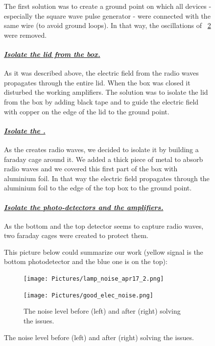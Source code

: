 \begin{figure}[!hbtp]
  The first solution was to create a ground point on which all devices - especially the square wave pulse generator - were connected with the same wire 
  (to avoid ground loops). In that way, the oscillations of ~\ref{fig:comparaison} were removed. 
  
  \paragraph{\underline{\emph{Isolate the lid from the box.}}}
  
  As it was described above, the electric field from the radio waves propagates through the entire lid. When the box was closed it disturbed the working 
  amplifiers. The solution was to isolate the lid from the box by adding black tape and to guide the electric field with copper on the edge of the lid
  to the ground point.

  \paragraph{\underline{\emph{Isolate the \xfl.}}}
  
  As the \xfl creates radio waves, we decided to isolate it by building a faraday cage around it. We added a thick piece of metal to absorb radio waves 
  and we covered this first part of the box with aluminium foil. In that way the electric field propagates through the aluminium foil to the edge of the top
  box to the ground point. 

  \paragraph{\underline{\emph{Isolate the photo-detectors and the amplifiers.}}}
  
  As the bottom and the top detector seems to capture radio waves, two faraday cages were created to protect them.
  
  This picture below could summarize our work (yellow signal is the bottom photodetector and the blue one is on the top):
 
  \begin{figure}[!hbtp]
  \begin{minipage}[t,High electronic noise level.]{0.49\linewidth}
    \texttt{[image: Pictures/lamp\_noise\_apr17\_2.png]}
  \end{minipage}
  \quad
  \begin{minipage}[t,Low electronic noise level.]{0.49\linewidth}
    \texttt{[image: Pictures/good\_elec\_noise.png]}
  \end{minipage}
  \caption{The noise level before (left) and after (right) solving the issues.}
  \label{fig:comparaison}
  \end{figure}
  

\end{figure}
